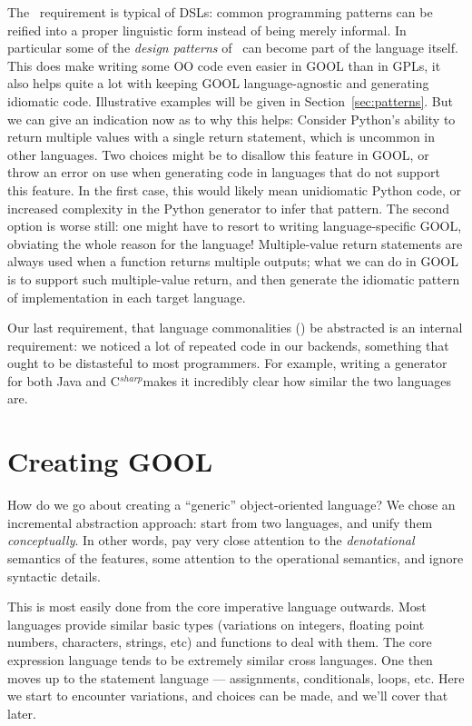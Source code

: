 \documentclass[sigplan,review,anonymous,prologue,dvipsnames]{acmart}
\newcommand{\Csharp}{C$^{sharp}$}
\begin{document}
The \oopatterns~requirement is typical of DSLs: common programming patterns
can be reified into a proper linguistic form instead of being merely
informal. In particular some of the \emph{design patterns} of~\cite{gamma1995design}
can become part of the language itself. This does make writing some OO
code even easier in GOOL than in GPLs, it also helps quite a lot with
keeping GOOL language-agnostic and generating idiomatic code. Illustrative
examples will be given in Section~\ref{sec:patterns}.  But we can give an
indication now as to why this helps: Consider Python's 
ability to return multiple values with a single return statement, which
is uncommon in other languages.  Two choices might be to disallow this
feature in GOOL, or throw an error on use when generating code in languages
that do not support this feature. In the first case, this would likely mean
unidiomatic Python code, or increased complexity in the Python generator to
infer that pattern. The second option is worse still: one might have to resort
to writing language-specific GOOL, obviating the whole reason for the language!
Multiple-value return statements are always used when a function returns multiple
outputs; what we can do in GOOL is to support such multiple-value return, and
then generate the idiomatic pattern of implementation in each target language.

Our last requirement, that language commonalities (\common) be abstracted is
an internal requirement: we noticed a lot of repeated code in our backends, 
something that ought to be distasteful to most programmers. For example, writing
a generator for both Java and \Csharp makes it incredibly clear how similar the two
languages are.

\section{Creating GOOL} \label{sec:creating}

How do we go about creating a ``generic'' object-oriented language?
We chose an incremental abstraction approach: start from two languages,
and unify them \emph{conceptually}.  In other words, pay very close
attention to the \emph{denotational} semantics of the features, some
attention to the operational semantics, and ignore syntactic details.

This is most easily done from the core imperative language outwards.
Most languages provide similar basic types (variations on integers,
floating point numbers, characters, strings, etc) and functions to deal
with them. The core expression language tends to be extremely similar
cross languages. One then moves up to the statement language ---
assignments, conditionals, loops, etc.  Here we start to encounter
variations, and choices can be made, and we'll cover that later.
\end{document}
